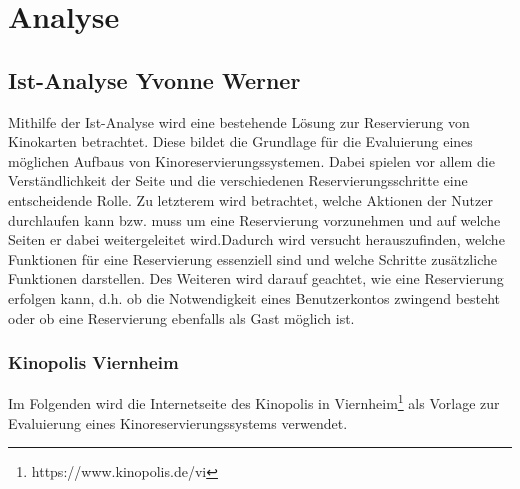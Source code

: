 \chapter{Analyse} \label{analyse}
	
	
	\section[Ist-Analyse]{Ist-Analyse {\hfill \normalsize Yvonne Werner}}\label{istAnalyse}
	Mithilfe der Ist-Analyse wird eine bestehende Lösung zur Reservierung von Kinokarten betrachtet. Diese bildet die Grundlage für die Evaluierung eines möglichen Aufbaus von Kinoreservierungssystemen. Dabei spielen vor allem die Verständlichkeit der Seite und die verschiedenen Reservierungsschritte eine entscheidende Rolle. Zu letzterem wird betrachtet, welche Aktionen der Nutzer durchlaufen kann bzw. muss um eine Reservierung vorzunehmen und auf welche Seiten er dabei weitergeleitet wird.Dadurch wird versucht herauszufinden, welche Funktionen für eine Reservierung essenziell sind und welche Schritte zusätzliche Funktionen darstellen. Des Weiteren wird darauf geachtet, wie eine Reservierung erfolgen kann, d.h. ob die Notwendigkeit eines Benutzerkontos zwingend besteht oder ob eine Reservierung ebenfalls als Gast möglich ist. 
	
	\subsection{Kinopolis Viernheim}
	Im Folgenden wird die Internetseite des Kinopolis in Viernheim\footnote{https://www.kinopolis.de/vi} als Vorlage zur Evaluierung eines Kinoreservierungssystems verwendet. 
	
